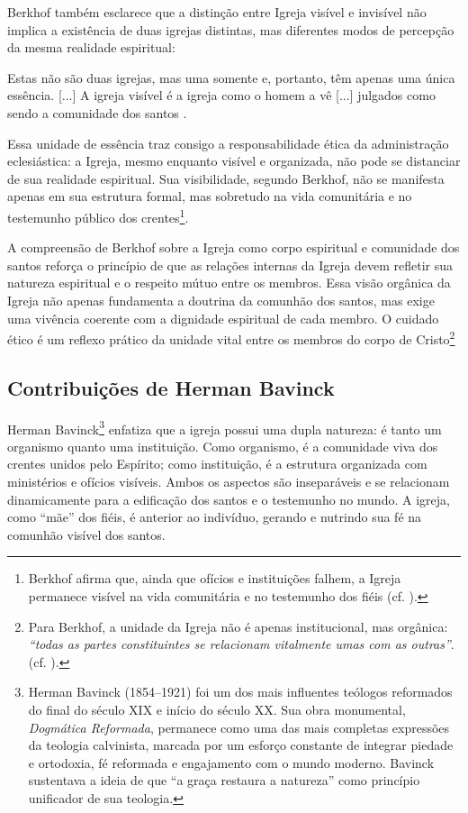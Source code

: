 Berkhof também esclarece que a distinção entre Igreja visível e invisível não implica a existência de duas igrejas distintas, mas diferentes modos de percepção da mesma realidade espiritual:

\begin{citacao}
    Estas não são duas igrejas, mas uma somente e, portanto, têm apenas uma única essência. [...] A igreja visível é a igreja como o homem a vê [...] julgados como sendo a comunidade dos santos \cite[p.~642]{berkhof2012}.
\end{citacao}

Essa unidade de essência traz consigo a responsabilidade ética da administração eclesiástica: a Igreja, mesmo enquanto visível e organizada, não pode se distanciar de sua realidade espiritual. Sua visibilidade, segundo Berkhof, não se manifesta apenas em sua estrutura formal, mas sobretudo na vida comunitária e no testemunho público dos crentes\footnote{Berkhof afirma que, ainda que ofícios e instituições falhem, a Igreja permanece visível na vida comunitária e no testemunho dos fiéis (cf. \cite[p.~645]{berkhof2012}).}.

A compreensão de Berkhof sobre a Igreja como corpo espiritual e comunidade dos santos reforça o princípio de que as relações internas da Igreja devem refletir sua natureza espiritual e o respeito mútuo entre os membros. Essa visão orgânica da Igreja não apenas fundamenta a doutrina da comunhão dos santos, mas exige uma vivência coerente com a dignidade espiritual de cada membro. O cuidado ético é um reflexo prático da unidade vital entre os membros do corpo de Cristo\footnote{Para Berkhof, a unidade da Igreja não é apenas institucional, mas orgânica: \textit{``todas as partes constituintes se relacionam vitalmente umas com as outras''}. (cf. \cite[p.~646]{berkhof2012}).}

\subsection{Contribuições de Herman Bavinck}

Herman Bavinck\footnote{Herman Bavinck (1854–1921) foi um dos mais influentes teólogos reformados do final do século XIX e início do século XX. Sua obra monumental, \textit{Dogmática Reformada}, permanece como uma das mais completas expressões da teologia calvinista, marcada por um esforço constante de integrar piedade e ortodoxia, fé reformada e engajamento com o mundo moderno. Bavinck sustentava a ideia de que ``a graça restaura a natureza'' como princípio unificador de sua teologia.} enfatiza que a igreja possui uma dupla natureza: é tanto um organismo quanto uma instituição. Como organismo, é a comunidade viva dos crentes unidos pelo Espírito; como instituição, é a estrutura organizada com ministérios e ofícios visíveis. Ambos os aspectos são inseparáveis e se relacionam dinamicamente para a edificação dos santos e o testemunho no mundo. A igreja, como ``mãe'' dos fiéis, é anterior ao indivíduo, gerando e nutrindo sua fé na comunhão visível dos santos. \cite{bavinck2012}

